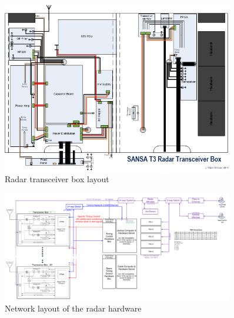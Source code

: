 \vfill
\begin{figure}[H]
	\centering
	\includegraphics[width=0.9\textwidth]{images/introduction/box_diagram.jpg}
	\caption{Radar transceiver box layout}
	\label{fig:intro_box}
\end{figure}
\vfill
\begin{figure}[H]
	\centering
	\includegraphics[width=0.9\textwidth]{images/introduction/layout.pdf}
	\caption{Network layout of the radar hardware}
	\label{fig:intro_hw}
\end{figure}
\vfill

\clearpage

